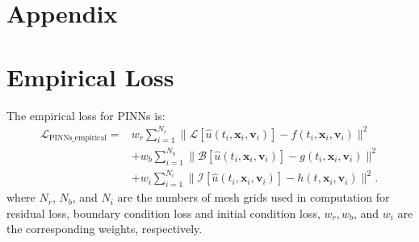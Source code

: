 \section*{Appendix}

\section*{Empirical Loss} 
The empirical loss for PINNs is:
\begin{equation}
\begin{aligned}
\mathcal{L}_\text{PINNs\_empirical} 
    =& w_r \sum_{i=1}^{N_\textit{r}} \|\mathcal{L}[\hat{u}(t_i, \boldsymbol{x}_i, \boldsymbol{v}_i)]-f(t_i, \boldsymbol{x}_i, \boldsymbol{v}_i)\|^2 \\
    &+
     w_b \sum_{i=1}^{N_b} \|\mathcal{B}[\hat{u}(t_i, \boldsymbol{x}_i, \boldsymbol{v}_i)]-g(t_i, \boldsymbol{x}_i, \boldsymbol{v}_i)\|^2 \\
    & + w_i\sum_{i=1}^{N_i} \|\mathcal{I}[\hat{u}(t_i, \boldsymbol{x}_i, \boldsymbol{v}_i)]-h(t, \boldsymbol{x}_i, \boldsymbol{v}_i)\|^2.
\end{aligned}
\label{empirical_loss_appendix}
\end{equation}
where $N_{r}$, $N_{b}$, and $N_{i}$ are the numbers of mesh grids used in computation for residual loss, boundary condition loss and initial condition loss, $w_r, w_b$, and $w_i$ are the corresponding weights, respectively. 
